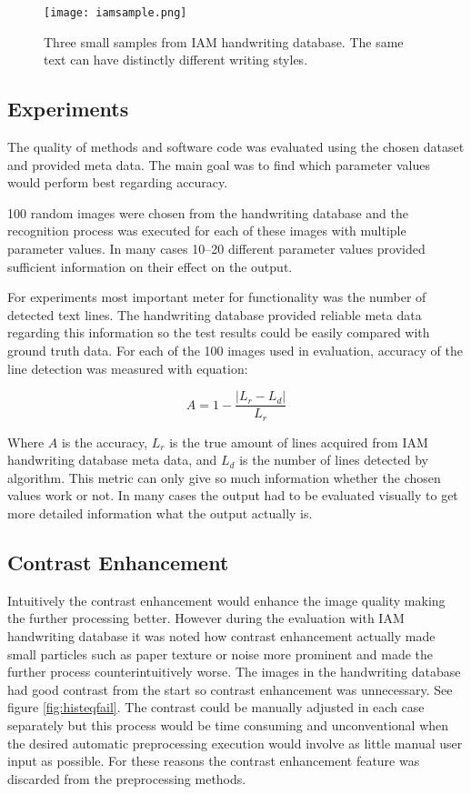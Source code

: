 \documentclass{article}
\begin{document}
    \begin{figure}[!ht]
      \centering
      \texttt{[image: iamsample.png]}
      \caption{Three small samples from IAM handwriting database. The same text can have distinctly different writing styles. \label{fig:iamsample} }
    \end{figure}

  \subsection{Experiments}
    The quality of methods and software code was evaluated using the chosen dataset and provided meta data. The main goal was to find which parameter values would perform best regarding accuracy.

    100 random images were chosen from the handwriting database and the recognition process was executed for each of these images with multiple parameter values. In many cases 10--20 different parameter values provided sufficient information on their effect on the output.

    For experiments most important meter for functionality was the number of detected text lines. The handwriting database provided reliable meta data regarding this information so the test results could be easily compared with ground truth data. For each of the 100 images used in evaluation, accuracy of the line detection was measured with equation:

    \begin{equation}
      A = 1-\frac{|L_r-L_d|}{L_r}
    \end{equation}

    Where $A$ is the accuracy, $L_r$ is the true amount of lines acquired from IAM handwriting database meta data, and $L_d$ is the number of lines detected by algorithm. This metric can only give so much information whether the chosen values work or not. In many cases the output had to be evaluated visually to get more detailed information what the output actually is.


  \subsection{Contrast Enhancement}
    Intuitively the contrast enhancement would enhance the image quality making the further processing better. However during the evaluation with IAM handwriting database it was noted how contrast enhancement actually made small particles such as paper texture or noise more prominent and made the further process counterintuitively worse. The images in the handwriting database had good contrast from the start so contrast enhancement was unnecessary. See figure \ref{fig:histeqfail}. The contrast could be manually adjusted in each case separately but this process would be time consuming and unconventional when the desired automatic preprocessing execution would involve as little manual user input as possible. For these reasons the contrast enhancement feature was discarded from the preprocessing methods.
\end{document}
